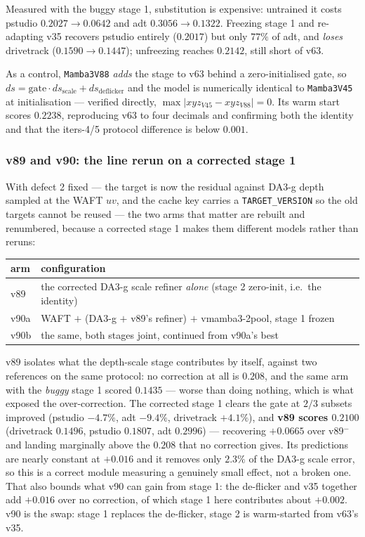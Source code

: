\documentclass[11pt,a4paper]{article}
\begin{document}
Measured with the buggy stage 1, substitution is expensive: untrained it costs pstudio
$0.2027\!\to\!0.0642$ and adt $0.3056\!\to\!0.1322$. Freezing stage 1 and re-adapting v35 recovers
pstudio entirely ($0.2017$) but only $77\%$ of adt, and \emph{loses} drivetrack
($0.1590\!\to\!0.1447$); unfreezing reaches $0.2142$, still short of v63.

As a control, \texttt{Mamba3V88} \emph{adds} the stage to v63 behind a zero-initialised gate, so
$ds=\mathrm{gate}\cdot ds_{\mathrm{scale}}+ds_{\mathrm{deflicker}}$ and the model is numerically
identical to \texttt{Mamba3V45} at initialisation --- verified directly,
$\max|xyz_{V45}-xyz_{V88}|=0$. Its warm start scores $0.2238$, reproducing v63 to four decimals and
confirming both the identity and that the iters-4/5 protocol difference is below $0.001$.

\subsubsection{v89 and v90: the line rerun on a corrected stage 1}
\label{sec:dsr-v8990}

With defect 2 fixed --- the target is now the residual against DA3-g depth sampled at the WAFT $uv$,
and the cache key carries a \texttt{TARGET\_VERSION} so the old targets cannot be reused --- the
two arms that matter are rebuilt and renumbered, because a corrected stage 1 makes them different
models rather than reruns:

\begin{center}\small
\begin{tabular}{ll}
\toprule
arm & configuration \\
\midrule
v89   & the corrected DA3-g scale refiner \emph{alone} (stage 2 zero-init, i.e.\ the identity) \\
v90a  & WAFT $+$ (DA3-g $+$ v89's refiner) $+$ vmamba3-2pool, stage 1 frozen \\
v90b  & the same, both stages joint, continued from v90a's best \\
\bottomrule
\end{tabular}
\end{center}

v89 isolates what the depth-scale stage contributes by itself, against two references on the same
protocol: no correction at all is $0.208$, and the same arm with the \emph{buggy} stage 1 scored
$0.1435$ --- worse than doing nothing, which is what exposed the over-correction. The corrected
stage 1 clears the gate at $2/3$ subsets improved (pstudio $-4.7\%$, adt $-9.4\%$, drivetrack
$+4.1\%$), and \textbf{v89 scores $0.2100$} (drivetrack $0.1496$, pstudio $0.1807$, adt $0.2996$)
--- recovering $+0.0665$ over v89$^{-}$ and landing marginally above the $0.208$ that no correction
gives. Its predictions are nearly constant at $+0.016$ and it removes only $2.3\%$ of the DA3-g
scale error, so this is a correct module measuring a genuinely small effect, not a broken one. That
also bounds what v90 can gain from stage 1: the de-flicker and v35 together add $+0.016$ over no
correction, of which stage 1 here contributes about $+0.002$. v90 is the swap:
stage 1 replaces the de-flicker, stage 2 is warm-started from v63's v35.
\end{document}
